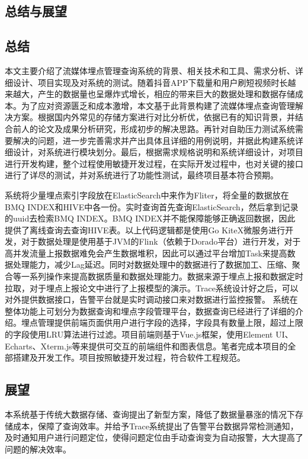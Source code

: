 \begin{longtable}[htbp]
\chapter{总结与展望}

\section{总结}
本文主要介绍了流媒体埋点管理查询系统的背景、相关技术和工具、需求分析、详细设计、项目实现及对系统的测试。随着抖音APP下载量和用户刷短视频时长越来越大，产生的数据量也呈爆炸式增长，相应的带来巨大的数据处理和数据存储成本。为了应对资源匮乏和成本激增，本文基于此背景构建了流媒体埋点查询管理解决方案。根据国内外常见的存储方案进行对比分析优，依据已有的知识背景，并结合前人的论文及成果分析研究，形成初步的解决思路。再针对自助压力测试系统需要解决的问题，进一步完善需求并产出具体且详细的用例说明，并据此构建系统详细设计，对系统进行模块划分。最后，根据需求规格说明和系统详细设计，对项目进行开发构建，整个过程使用敏捷开发过程，在实际开发过程中，也对关键的接口进行了详尽的测试，并对系统进行了功能性测试，最终项目基本符合预期。

系统将少量埋点索引字段放在ElasticSearch中来作为Fliter，将全量的数据放在BMQ INDEX和HIVE中各一份。实时查询首先查询ElasticSearch，然后拿到记录的uuid去检索BMQ INDEX。BMQ INDEX并不能保障能够正确返回数据，因此提供了离线查询去查询HIVE表。以上代码逻辑都是使用Go KiteX微服务进行开发，对于数据处理是使用基于JVM的Flink（依赖于Dorado平台）进行开发，对于高并发流量上报数据难免会产生数据堆积，因此可以通过平台增加Task来提高数据处理能力，减少Lag延迟。同时对数据处理中的数据进行了数据加工、压缩、聚合等一系列操作来提高数据质量和数据处理能力。数据来源于埋点上报和数据定时拉取，对于埋点上报论文中进行了上报模型的演示。Trace系统设计好之后，可以对外提供数据接口，告警平台就是实时调动接口来对数据进行监控报警。
系统在整体功能上可划分为数据查询和埋点字段管理平台，数据查询已经进行了详细的介绍。埋点管理提供前端页面供用户进行字段的选择，字段具有数量上限，超过上限的字段使用LRU算法进行过滤。项目前端则基于Vue.js框架，使用Element UI、Echarts、Xterm.js等来提供可交互的前端组件和图表信息。笔者完成本项目的全部搭建及开发工作。项目按照敏捷开发过程，符合软件工程规范。

\section{展望}

本系统基于传统大数据存储、查询提出了新型方案，降低了数据量暴涨的情况下存储成本，保障了查询效率。并给予Trace系统提出了告警平台数据异常检测通知，及时通知用户进行问题定位，使得问题定位由手动查询变为自动报警，大大提高了问题的解决效率。


\end{longtable}
